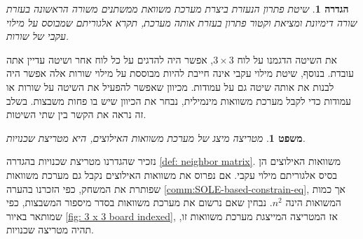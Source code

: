 \documentclass[12pt,leqno]{article}
\theoremstyle{theoremdd}
\newtheorem{definition}{הגדרה}[section]
\newtheorem{theorem}{משפט}[section]
\begin{document}
\begin{definition}
    \label{def: spanish way}
    שיטת פתרון הנעזרת ביצרת מערכת משוואת ממשתנים משורה הראשונה בעזרת שורה דימיונת
    ומציאת וקטור פתרון
    בעזרת אותה מערכת,
    תקרא 
    אלגוריתם שמבוסס על מילוי עקבי של שורות.
\end{definition}
את השיטה הדגמנו על לוח 
$3 \times 3$,
אפשר היה להדגים על כל לוח אחר ושיטה עדיין אתה עובדת.
בנוסף, שיטת
מילוי עקבי אינה חייבת להיות מבוססת על מילוי שורות אלה 
אפשר היה לבנות את אותה שיטה גם על עמודות.
מכיוון שאפשר להפעיל את השיטה על שורות או עמודות 
כדי לקבל מערכת משוואות מינמילית, נבחר 
את הכיוון שיש בו פחות משבצות. 
בשלב זה נראה את הקשר בין שתי השיטות.
\begin{theorem}
    מטריצה מיצג של מערכת משוואות האילוצים, היא מטריצת שכנויות.
\end{theorem}
נזכיר שהגדרנו מטריצת שכנויות בהגדרה
\ref{def: neighbor matrix}.
משוואות האילוצים הן בסיס אלגוריתם מילוי עקבי.
אם נפרוס את משוואות האילוצים נקבל גם מערכת משוואות שפותרת את המשחק,
כפי הזכרנו בהערה 
\ref{comm:SOLE-based-constrain-eq},
אך כמות המשואות הינה 
$n^2$.
נבחין שאם נרשום את 
מערכת 
משוואות בסדר 
מיספור המשבצות,
כפי שמותאר באיור 
\ref{fig: 3 x 3 board indexed},
אז
המטריצה המייצגת מערכת משוואות זו, תהיה 
מטריצה שכנויות.
\end{document}
